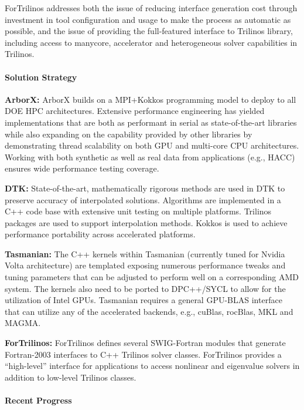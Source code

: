ForTrilinos addresses both the issue of reducing interface generation cost
through investment in tool configuration and usage to make the process as
automatic as possible, and the issue of providing the full-featured interface to
Trilinos library, including access to manycore, accelerator and heterogeneous
solver capabilities in Trilinos.


\paragraph{Solution Strategy}

\nobreak


\indent

{\bf ArborX:} ArborX builds on a MPI+Kokkos programming model to deploy to all
DOE HPC architectures. Extensive performance engineering has yielded
implementations that are both as performant in serial as state-of-the-art
libraries while also expanding on the capability provided by other libraries by
demonstrating thread scalability on both GPU and multi-core CPU architectures.
Working with both synthetic as well as real data from applications (e.g., HACC)
ensures wide performance testing coverage.

{\bf DTK:} State-of-the-art, mathematically rigorous methods are used in DTK
to preserve accuracy of interpolated solutions.  Algorithms are implemented in
a C++ code base with extensive unit testing on multiple platforms.  Trilinos
packages are used to support interpolation methods.  Kokkos is used to achieve
performance portability across accelerated platforms.

{\bf Tasmanian:} The C++ kernels within Tasmanian (currently tuned for Nvidia
Volta architecture) are templated exposing numerous performance tweaks and
tuning parameters that can be adjusted to perform well on a corresponding AMD
system.
The kernels also need to be ported to DPC++/SYCL to allow for the utilization
of Intel GPUs. Tasmanian requires a general GPU-BLAS interface that can
utilize any of the accelerated backends, e.g., cuBlas, rocBlas, MKL and MAGMA.

{\bf ForTrilinos:}
ForTrilinos defines several SWIG-Fortran modules that generate Fortran-2003
interfaces to C++ Trilinos solver classes. ForTrilinos provides a
``high-level'' interface for applications to access nonlinear and eigenvalue
solvers in addition to low-level Trilinos classes.


\paragraph{Recent Progress}

